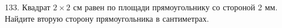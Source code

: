 133. Квадрат $2\times2$ см равен по площади прямоугольнику со стороной 2 мм. Найдите вторую сторону прямоугольника в сантиметрах.\\
